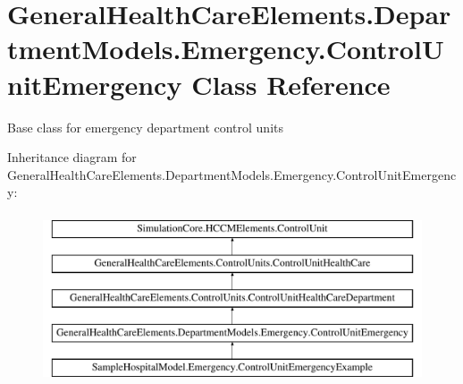 \hypertarget{class_general_health_care_elements_1_1_department_models_1_1_emergency_1_1_control_unit_emergency}{}\section{General\+Health\+Care\+Elements.\+Department\+Models.\+Emergency.\+Control\+Unit\+Emergency Class Reference}
\label{class_general_health_care_elements_1_1_department_models_1_1_emergency_1_1_control_unit_emergency}


Base class for emergency department control units  


Inheritance diagram for General\+Health\+Care\+Elements.\+Department\+Models.\+Emergency.\+Control\+Unit\+Emergency\+:\begin{figure}[H]
\begin{center}
\leavevmode
\includegraphics[height=5.000000cm]{class_general_health_care_elements_1_1_department_models_1_1_emergency_1_1_control_unit_emergency}
\end{center}
\end{figure}

